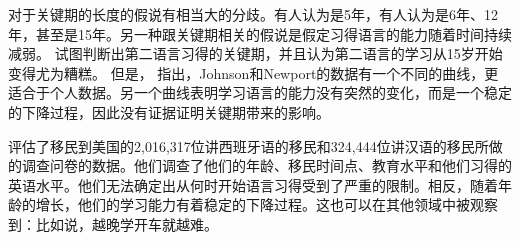 对于关键期的长度的假说有相当大的分歧。有人认为是5年，有人认为是6年、12年，甚至是15年\citep[]{HBW2003a}。另一种跟关键期相关的假说是假定习得语言的能力随着时间持续减弱。
 \citet{JN89a}试图判断出第二语言习得的关键期，并且认为第二语言的学习从15岁开始变得尤为糟糕。\nocite{Sorace2003a}
但是， \citet*[\page]{EBJKSPP96a}指出，Johnson和Newport的数据有一个不同的曲线，更适合于个人数据。另一个曲线表明学习语言的能力没有突然的变化，而是一个稳定的下降过程，因此没有证据证明关键期带来的影响。

 \citet*{HBW2003a}评估了移民到美国的2,016,317位讲西班牙语的移民和324,444位讲汉语的移民所做的调查问卷的数据。他们调查了他们的年龄、移民时间点、教育水平和他们习得的英语水平。他们无法确定出从何时开始语言习得受到了严重的限制。相反，随着年龄的增长，他们的学习能力有着稳定的下降过程。这也可以在其他领域中被观察到：比如说，越晚学开车就越难。

